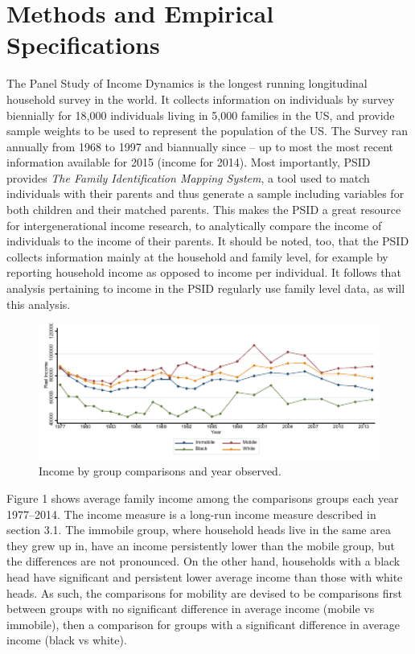 \documentclass[notitlepage,12pt]{article}
\begin{document}
\section{Methods and Empirical Specifications}
The Panel Study of Income Dynamics is the longest running longitudinal household survey in the world.  It collects information on individuals by survey biennially for 18,000 individuals living in 5,000 families in the US, and provide sample weights to be used to represent the population of the US.  The Survey ran annually from 1968 to 1997 and biannually since -- up to most the most recent information available for 2015 (income for 2014).  Most importantly, PSID provides \textit{The Family Identification Mapping System}, a tool used to match individuals with their parents and thus generate a sample including variables for both children and their matched parents.  This makes the PSID a great resource for intergenerational income research, to analytically compare the income of individuals to the income of their parents.  It should be noted, too, that the PSID collects information mainly at the household and family level, for example by reporting household income as opposed to income per individual.  It follows that analysis pertaining to income in the PSID regularly use family level data, as will this analysis.

\begin{figure}[H]
  \centering
  \caption{Income by group comparisons and year observed.}
  \includegraphics[width=6.5in]{Graph20.pdf}
\end{figure}

Figure 1 shows average family income among the comparisons groups each year 1977--2014.  The income measure is a long-run income measure described in section 3.1.  The immobile group, where household heads live in the same area they grew up in, have an income persistently lower than the mobile group, but the differences are not pronounced.  On the other hand, households with a black head have significant and persistent lower average income than those with white heads.  As such, the comparisons for mobility are devised to be comparisons first between groups with no significant difference in average income (mobile vs immobile), then a comparison for groups with a significant difference in average income (black vs white).
\end{document}
